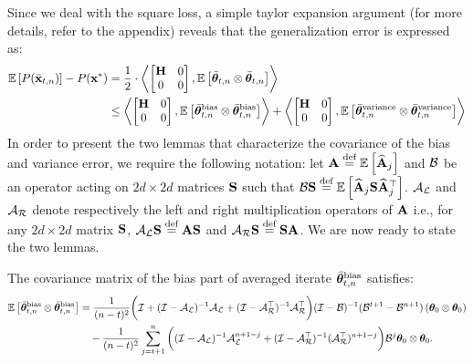 Since we deal with the square loss, a simple taylor expansion argument (for more details, refer to the appendix) reveals that the generalization error is expressed as:\iffalse
Note that $\E{\thetavb \otimes \thetavb}$ is an important quantity for the purpose of obtaining the generalization error of the proposed accelerated algorithm. In particular, since we deal with the square loss, using a taylor expansion argument around the optimum $\xs$ (for more details, see the appendix), we note that the generalization error is expressed as:\fi
\begin{align*}
\E{P(\bar{\x}_{t,n})}-P(\xs)&=\frac{1}{2}\cdot\iprod{\begin{bmatrix}\Cov&0\\0&0\end{bmatrix}}{\E{\thetavb \otimes \thetavb}}\\
&\leq\iprod{\begin{bmatrix}\Cov&0\\0&0\end{bmatrix}}{\E{\thetavb^{\textrm{bias}} \otimes \thetavb^{\textrm{bias}}}}+\iprod{\begin{bmatrix}\Cov&0\\0&0\end{bmatrix}}{\E{\thetavb^{\textrm{variance}} \otimes \thetavb^{\textrm{variance}}}}
\end{align*}
In order to present the two lemmas that characterize the covariance of the bias and variance error, we require the following notation: let $\A \eqdef \E{\Ahatj}$ and $\B$ be an operator acting on $2d \times 2d$ matrices $\S$ such that $\B \S \eqdef \E{\Ahatj \S \Ahatj\T}$. $\AL$ and $\AR$ denote respectively the left and right multiplication operators of $\A$ i.e., for any $2d\times 2d$ matrix $\S$, $\AL \S \eqdef \A \S$ and $\AR \S \eqdef \S \A$. We are now ready to state the two lemmas.
\begin{lemma}\label{lem:average-covar-bias}
	The covariance matrix of the bias part of averaged iterate $\thetavb^{\textrm{bias}}$ satisfies:
	\begin{align*}
	 \E{\thetavb^{\textrm{bias}} \otimes \thetavb^{\text{bias}}} &= \frac{1}{(n-t)^2} \bigg( \eyeT + (\eyeT-\AL)^{-1}\AL + (\eyeT-\AR\T)^{-1}\AR\T\bigg) (\eyeT-\BT)^{-1}(\BT^{t+1}-\BT^{n+1}) \left(\thetat[0]\otimes \thetat[0]\right)\\	 &\quad -\frac{1}{(n-t)^2}\sum_{j=t+1}^n\bigg( (\eyeT-\AL)^{-1}\AL^{n+1-j} + (\eyeT-\AR\T)^{-1}(\AR\T)^{n+1-j} \bigg)\BT^j \thetat[0] \otimes \thetat[0] .
	\end{align*}
\end{lemma}
